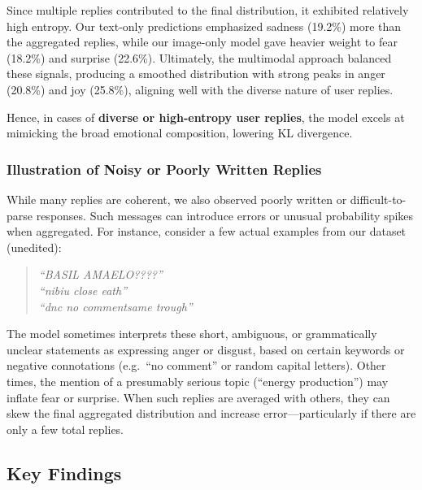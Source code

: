 Since multiple replies contributed to the final distribution, it exhibited relatively high entropy. Our text-only predictions emphasized sadness (19.2\%) more than the aggregated replies, while our image-only model gave heavier weight to fear (18.2\%) and surprise (22.6\%). Ultimately, the multimodal approach balanced these signals, producing a smoothed distribution with strong peaks in anger (20.8\%) and joy (25.8\%), aligning well with the diverse nature of user replies.
\newline

Hence, in cases of \textbf{diverse or high-entropy user replies}, the model excels at mimicking the broad emotional composition, lowering KL divergence.

\vspace{1em}
\subsubsection*{Illustration of Noisy or Poorly Written Replies}

While many replies are coherent, we also observed poorly written or difficult-to-parse responses. Such messages can introduce errors or unusual probability spikes when aggregated. For instance, consider a few actual examples from our dataset (unedited):

\begin{quote}
\emph{``BASIL AMAELO????''} \\
\emph{``nibiu close eath''} \\
\emph{``dnc no commentsame trough''} \\
\end{quote}

The model sometimes interprets these short, ambiguous, or grammatically unclear statements as expressing anger or disgust, based on certain keywords or negative connotations (e.g.\ ``no comment'' or random capital letters). Other times, the mention of a presumably serious topic (``energy production'') may inflate fear or surprise. When such replies are averaged with others, they can skew the final aggregated distribution and increase error—particularly if there are only a few total replies.

\bigskip


\subsection{Key Findings}
